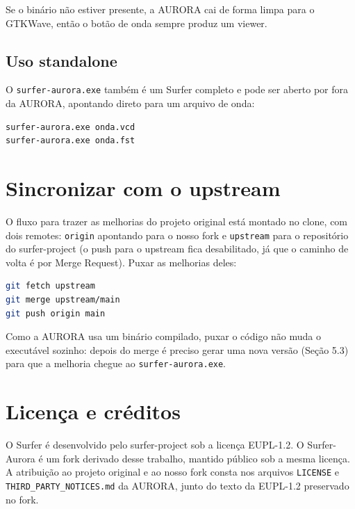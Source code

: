 \documentclass[11pt,a4paper]{article}
\begin{document}
Se o binário não estiver presente, a AURORA cai de forma limpa para o GTKWave,
então o botão de onda sempre produz um viewer.

\subsection{Uso standalone}

O \texttt{surfer-aurora.exe} também é um Surfer completo e pode ser aberto por
fora da AURORA, apontando direto para um arquivo de onda:

\begin{lstlisting}[language=bash]
surfer-aurora.exe onda.vcd
surfer-aurora.exe onda.fst
\end{lstlisting}

\section{Sincronizar com o upstream}

O fluxo para trazer as melhorias do projeto original está montado no clone, com
dois remotes: \texttt{origin} apontando para o nosso fork e \texttt{upstream}
para o repositório do surfer-project (o push para o upstream fica desabilitado,
já que o caminho de volta é por Merge Request). Puxar as melhorias deles:

\begin{lstlisting}[language=bash]
git fetch upstream
git merge upstream/main
git push origin main
\end{lstlisting}

Como a AURORA usa um binário compilado, puxar o código não muda o executável
sozinho: depois do merge é preciso gerar uma nova versão (Seção 5.3) para que a
melhoria chegue ao \texttt{surfer-aurora.exe}.

\section{Licença e créditos}

O Surfer é desenvolvido pelo surfer-project sob a licença EUPL-1.2. O
Surfer-Aurora é um fork derivado desse trabalho, mantido público sob a mesma
licença. A atribuição ao projeto original e ao nosso fork consta nos arquivos
\texttt{LICENSE} e \texttt{THIRD\_PARTY\_NOTICES.md} da AURORA, junto do texto da
EUPL-1.2 preservado no fork.
\end{document}
